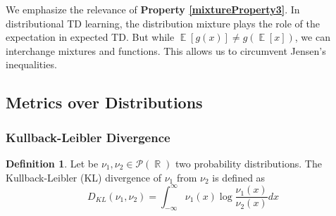 \documentclass[12pt,a4paper,openright,twoside]{article}
\DeclareMathOperator*{\E}{\mathbb{E}}
\DeclareMathOperator*{\R}{\mathbb{R}}
\numberwithin{equation}{section}
\theoremstyle{definition}
\newtheorem{definition}{Definition}
\theoremstyle{remark}
\theoremstyle{plain}
\begin{document}
We emphasize the relevance of \textbf{Property \ref{mixtureProperty3}}. In distributional TD learning, the distribution mixture plays the role of the expectation in expected TD. But while $\E[g(x)] \not= g(\E[x])$, we can interchange mixtures and functions. This allows us to circumvent Jensen's inequalities.

\subsection{Metrics over Distributions} \label{metrics}


\subsubsection{Kullback-Leibler Divergence}

\begin{definition}
	Let be $\nu_1, \nu_2 \in \mathscr{P}(\R)$ two probability distributions. The Kullback-Leibler (KL) divergence of $\nu_1$ from $\nu_2$ is defined as
	\begin{equation*}
		D_{KL} (\nu_1,\nu_2) = \int_{-\infty}^{\infty} \nu_1(x) \log \frac{\nu_1(x)}{\nu_2(x)} dx
	\end{equation*}
\end{definition}
\end{document}
